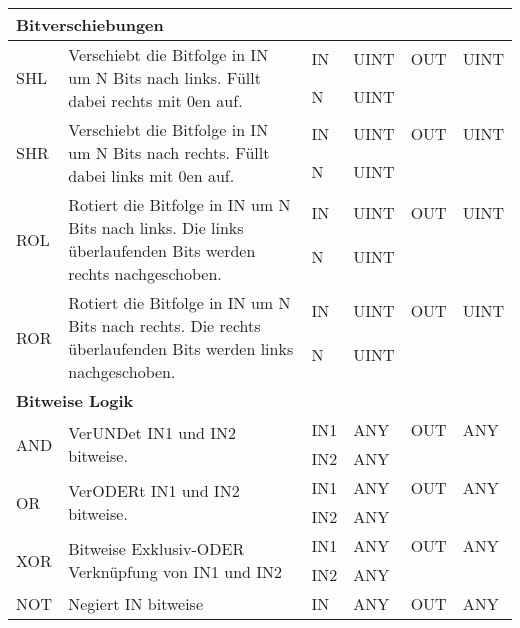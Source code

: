 {	%
\begin{table}
\centering
\renewcommand{\arraystretch}{1.2}
\begin{tabular}{|m{2cm}|m{7cm}|>{\raggedright}m{0.75cm} >{\raggedleft}m{1cm}|>{\raggedright}m{0.75cm} >{\raggedleft\arraybackslash}m{1cm}|}
\hline
\multicolumn{6}{|l|}{\textbf{Bitverschiebungen}}\\
\hline
\multirow{2}{*}{SHL}&\multirow{2}{7cm}{Verschiebt die Bitfolge in IN um N Bits nach links. Füllt dabei rechts mit 0en auf.}& IN & UINT & OUT & UINT\\
 & &N & UINT & &\\
\hline
\multirow{2}{*}{SHR}&\multirow{2}{7cm}{Verschiebt die Bitfolge in IN um N Bits nach rechts. Füllt dabei links mit 0en auf.}& IN & UINT & OUT & UINT\\
 & &N & UINT & &\\
\hline
\multirow{3}{*}{ROL}&\multirow{3}{7cm}{Rotiert die Bitfolge in IN um N Bits nach links. Die links überlaufenden Bits werden rechts nachgeschoben.}& IN & UINT & OUT & UINT\\
 & &N & UINT & &\\
 & & & & &\\
\hline
\multirow{3}{*}{ROR}&\multirow{3}{7cm}{Rotiert die Bitfolge in IN um N Bits nach rechts. Die rechts überlaufenden Bits werden links nachgeschoben.}& IN & UINT & OUT & UINT\\
 & &N & UINT & &\\
 & & & & &\\
\hline
\multicolumn{6}{|l|}{\textbf{Bitweise Logik}}\\
\hline
\multirow{2}{*}{AND}&\multirow{2}{7cm}{VerUNDet IN1 und IN2 bitweise.}& IN1 & ANY & OUT & ANY\\
 & &IN2 & ANY & &\\
\hline
\multirow{2}{*}{OR}&\multirow{2}{7cm}{VerODERt IN1 und IN2 bitweise.}& IN1 & ANY & OUT & ANY\\
 & &IN2 & ANY & &\\
\hline
\multirow{2}{*}{XOR}&\multirow{2}{7cm}{Bitweise Exklusiv-ODER Verknüpfung von IN1 und IN2}& IN1 & ANY & OUT & ANY\\
 & &IN2 & ANY & &\\
\hline
NOT & Negiert IN bitweise & IN & ANY & OUT & ANY\\
\hline


\end{tabular}
\end{table}}
